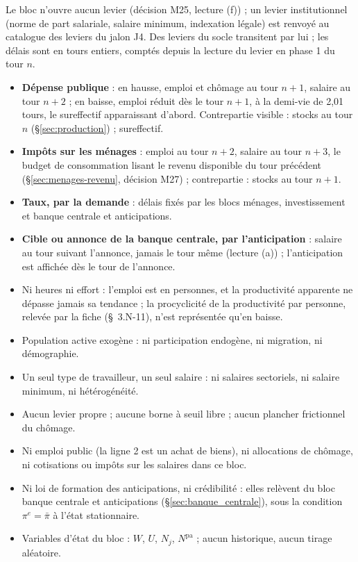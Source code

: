 \documentclass[11pt,a4paper]{article}
\begin{document}
\begin{joueur}
Le bloc n'ouvre aucun levier (décision M25, lecture (f)) ; un levier institutionnel (norme de part salariale, salaire minimum, indexation légale) est renvoyé au catalogue des leviers du jalon J4. Des leviers du socle transitent par lui ; les délais sont en tours entiers, comptés depuis la lecture du levier en phase 1 du tour $n$.
\begin{itemize}
\item \textbf{Dépense publique} : en hausse, emploi et chômage au tour $n + 1$, salaire au tour $n + 2$ ; en baisse, emploi réduit dès le tour $n + 1$, à la demi-vie de 2,01 tours, le sureffectif apparaissant d'abord. Contrepartie visible : stocks au tour $n$ (\S\ref{sec:production}) ; sureffectif.
\item \textbf{Impôts sur les ménages} : emploi au tour $n + 2$, salaire au tour $n + 3$, le budget de consommation lisant le revenu disponible du tour précédent (\S\ref{sec:menages-revenu}, décision M27) ; contrepartie : stocks au tour $n + 1$.
\item \textbf{Taux, par la demande} : délais fixés par les blocs ménages, investissement et banque centrale et anticipations.
\item \textbf{Cible ou annonce de la banque centrale, par l'anticipation} : salaire au tour suivant l'annonce, jamais le tour même (lecture (a)) ; l'anticipation est affichée dès le tour de l'annonce.
\end{itemize}
\end{joueur}

\begin{portee}
\begin{itemize}
\item Ni heures ni effort : l'emploi est en personnes, et la productivité apparente ne dépasse jamais sa tendance ; la procyclicité de la productivité par personne, relevée par la fiche (\S~3.N-11), n'est représentée qu'en baisse.
\item Population active exogène : ni participation endogène, ni migration, ni démographie.
\item Un seul type de travailleur, un seul salaire : ni salaires sectoriels, ni salaire minimum, ni hétérogénéité.
\item Aucun levier propre ; aucune borne à seuil libre ; aucun plancher frictionnel du chômage.
\item Ni emploi public (la ligne 2 est un achat de biens), ni allocations de chômage, ni cotisations ou impôts sur les salaires dans ce bloc.
\item Ni loi de formation des anticipations, ni crédibilité : elles relèvent du bloc banque centrale et anticipations (\S\ref{sec:banque_centrale}), sous la condition $\pi^e = \bar\pi$ à l'état stationnaire.
\item Variables d'état du bloc : $W$, $U$, $N_j$, $N^{\mathrm{pa}}$ ; aucun historique, aucun tirage aléatoire.
\end{itemize}
\end{portee}
\end{document}
